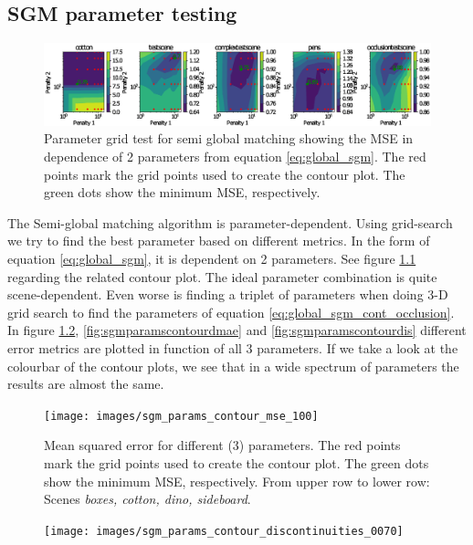 \documentclass  [
  paper    = a4,
  BCOR     = 10mm,
  twoside,
  fontsize = 12pt,
  fleqn,
  toc      = bibnumbered,
  toc      = listofnumbered,
  numbers  = noendperiod,
  headings = normal,
  listof   = leveldown,
  version  = 3.03
]                                       {scrreprt}
\begin{document}
\begin{appendix}
  	
  	 
  	\chapter{SGM parameter testing}
	\begin{figure}[h!]
  		\centering
  		\includegraphics[width=1\linewidth]{images/sgm_param_contour}
  		\caption[Parameter grid test for semi global matching]{Parameter grid test for semi global matching showing the MSE in dependence of 2 parameters from equation \ref{eq:global_sgm}. The red points mark the grid points used to create the contour plot. The green dots show the minimum MSE, respectively.}
  		\label{fig:sgmparamcontour}
  	\end{figure}
  	The Semi-global matching algorithm is parameter-dependent. Using grid-search we try to find the best parameter based on different metrics. In the form of equation \ref{eq:global_sgm}, it is dependent on 2 parameters. See figure \ref{fig:sgmparamcontour} regarding the related contour plot. The ideal parameter combination is quite scene-dependent. Even worse is finding a triplet of parameters when doing 3-D grid search to find the parameters of equation \ref{eq:global_sgm_cont_occlusion}. In figure \ref{fig:sgmparamscontourmse100}, \ref{fig:sgmparamscontourdmae} and \ref{fig:sgmparamscontourdis} different error metrics are plotted in function of all 3 parameters. If we take a look at the colourbar of the contour plots, we see that in a wide spectrum of parameters the results are almost the same.
  	\begin{figure}[h!]
  		\centering
  		\texttt{[image: images/sgm\_params\_contour\_mse\_100]}
  		\caption[Mean squared error for different (3) parameters]{Mean squared error for different (3) parameters. The red points mark the grid points used to create the contour plot. The green dots show the minimum MSE, respectively. From upper row to lower row: Scenes \textit{boxes, cotton, dino, sideboard}.}
  		\label{fig:sgmparamscontourmse100}
  	\end{figure}
  	\begin{figure}[h!]
  		\centering
  		\texttt{[image: images/sgm\_params\_contour\_discontinuities\_0070]}

\end{figure}
\end{appendix}
\end{document}
